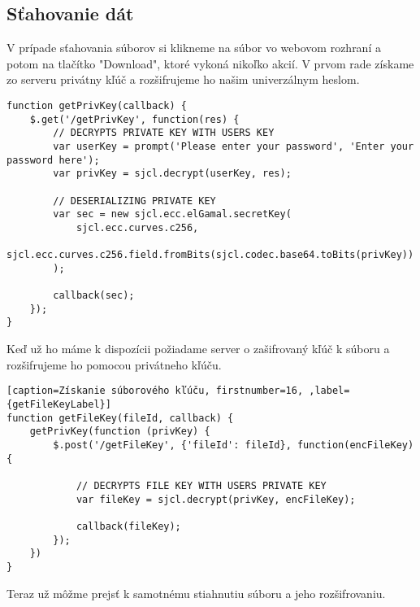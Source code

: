 	\subsection{Sťahovanie dát}
	
		V prípade sťahovania súborov si klikneme na súbor vo webovom rozhraní a potom na tlačítko "Download", ktoré vykoná nikoľko akcií. V prvom rade získame zo serveru privátny kľúč a rozšifrujeme ho našim univerzálnym heslom.
		
\medskip
\begin{lstlisting}[caption=Získanie privátneho kľúču]	
function getPrivKey(callback) {
    $.get('/getPrivKey', function(res) {
        // DECRYPTS PRIVATE KEY WITH USERS KEY
        var userKey = prompt('Please enter your password', 'Enter your password here');
        var privKey = sjcl.decrypt(userKey, res);

        // DESERIALIZING PRIVATE KEY
        var sec = new sjcl.ecc.elGamal.secretKey(
            sjcl.ecc.curves.c256,
            sjcl.ecc.curves.c256.field.fromBits(sjcl.codec.base64.toBits(privKey))
        );

        callback(sec);
    });
}
\end{lstlisting}

		Keď už ho máme k dispozícii požiadame server o zašifrovaný kľúč k súboru a rozšifrujeme ho pomocou privátneho kľúču.

\begin{lstlisting}[caption=Získanie súborového kľúču, firstnumber=16, ,label={getFileKeyLabel}]	
function getFileKey(fileId, callback) {
    getPrivKey(function (privKey) {
        $.post('/getFileKey', {'fileId': fileId}, function(encFileKey) {

            // DECRYPTS FILE KEY WITH USERS PRIVATE KEY
            var fileKey = sjcl.decrypt(privKey, encFileKey);

            callback(fileKey);
        });
    })
}
\end{lstlisting}

		Teraz už môžme prejsť k samotnému stiahnutiu súboru a jeho rozšifrovaniu. 
		
